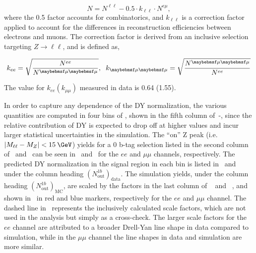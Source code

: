 \begin{equation}
  N = N^{\ell\ell} - 0.5\cdot k_{\ell\ell} \cdot N^{e\mu},
\end{equation}
where the 0.5 factor accounts for combinatorics, and $k_{\ell\ell}$ is a correction factor applied to account for the differences in reconstruction efficiencies between electrons and muons. The correction factor is derived from an inclusive selection targeting $Z\rightarrow\ell\ell$, and is defined as,

\begin{equation}
  k_{ee} = \sqrt{\frac{N^{ee}}{N^{\mu\mu}}}, \hspace{0.2cm} k_{\mu\mu} = \sqrt{\frac{N^{\mu\mu}}{N^{ee}}}
\end{equation}

The value for $k_{ee} (k_{\mu\mu})$ measured in data is 0.64 (1.55). 

In order to capture any \ptmiss dependence of the DY normalization, the various \Rinout quantities are computed in four bins of \ptmiss, shown in the fifth column of~-, since the relative contribution of DY is expected to drop off at higher \ptmiss values and incur larger statistical uncertainties in the simulation. The ``on'' Z peak (i.e. $|M_{\ell\ell} - M_Z| < 15\:\GeV$) yields for a 0 b-tag selection listed in the second column of~ and~ can be seen in~ and~ for the $ee$ and $\mu\mu$ channels, respectively. The predicted DY normalization in the signal region in each \ptmiss bin is listed in~ and ~ under the column heading $(N^{1b}_{\text{out}})_\text{data}$. The simulation yields, under the column heading $(N^{1b}_{\text{out}})_\text{MC}$, are scaled by the factors in the last column of ~ and ~, and shown in~ in red and blue markers, respectively for the $ee$ and $\mu\mu$ channel. The dashed line in~ represents the inclusively calculated scale factors, which are not used in the analysis but simply as a cross-check. The larger scale factors for the $ee$ channel are attributed to a broader Drell-Yan line shape in data compared to simulation, while in the $\mu\mu$ channel the line shapes in data and simulation are more similar.

